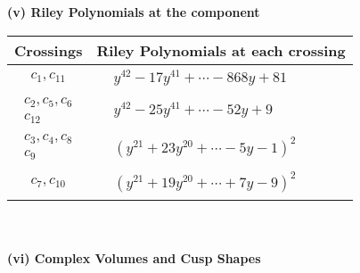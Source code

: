 \documentclass[1p]{elsarticle_modified}
\theoremstyle{definition}
\begin{document}
\newpage\renewcommand{\arraystretch}{1}
\flushleft \textbf{(v) Riley Polynomials at the component}\newline \\
\begin{tabular}{m{50pt}|m{274pt}}
Crossings & \hspace{64pt}Riley Polynomials at each crossing \\
\hline $$\begin{aligned}c_{1},c_{11}\end{aligned}$$&$\begin{aligned}
&y^{42}-17 y^{41}+\cdots-868 y+81
\end{aligned}$\\
\hline $$\begin{aligned}c_{2},c_{5},c_{6}\\c_{12}\end{aligned}$$&$\begin{aligned}
&y^{42}-25 y^{41}+\cdots-52 y+9
\end{aligned}$\\
\hline $$\begin{aligned}c_{3},c_{4},c_{8}\\c_{9}\end{aligned}$$&$\begin{aligned}
&(y^{21}+23 y^{20}+\cdots-5 y-1)^{2}
\end{aligned}$\\
\hline $$\begin{aligned}c_{7},c_{10}\end{aligned}$$&$\begin{aligned}
&(y^{21}+19 y^{20}+\cdots+7 y-9)^{2}
\end{aligned}$\\
\hline
\end{tabular}\\~\\
\newpage\flushleft \textbf{(vi) Complex Volumes and Cusp Shapes}
\end{document}

